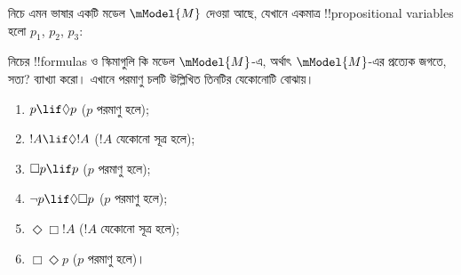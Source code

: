 \documentclass[../../../include/open-logic-section]{subfiles}
\begin{document}
\begin{prob}
  নিচে এমন ভাষার একটি মডেল $\mModel{M}$ দেওয়া আছে, যেখানে একমাত্র
  !!{propositional variable}s হলো $p_1$, $p_2$, $p_3$:
  \begin{center}
  \end{center}
  নিচের !!{formula}s ও স্কিমাগুলি কি মডেল $\mModel{M}$-এ, অর্থাৎ
  $\mModel{M}$-এর প্রত্যেক জগতে, সত্য? ব্যাখ্যা করো। এখানে পরমাণু
  চলটি উল্লিখিত তিনটির যেকোনোটি বোঝায়।
  \begin{enumerate}
  \item $p\lif \Diamond p$ ($p$ পরমাণু হলে);
  \item $!A\lif \Diamond !A$ ($!A$ যেকোনো সূত্র হলে);
  \item $\Box p \lif p$ ($p$ পরমাণু হলে);
  \item $\lnot p \lif \Diamond \Box p$ ($p$ পরমাণু হলে);
  \item $\Diamond \Box !A$ ($!A$ যেকোনো সূত্র হলে);
  \item $\Box \Diamond p$ ($p$ পরমাণু হলে)।
  \end{enumerate}
\end{prob}
\end{document}
